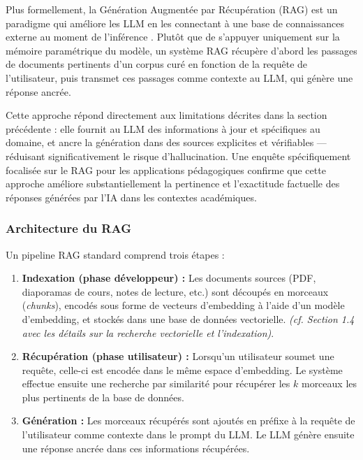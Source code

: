 \documentclass[a4paper,11pt]{article}
\begin{document}
Plus formellement, la Génération Augmentée par Récupération (RAG) est un
paradigme qui améliore les LLM en les connectant à une base de connaissances
externe au moment de l'inférence \cite{lewis2020rag}. Plutôt que de s'appuyer
uniquement sur la mémoire paramétrique du modèle, un système RAG récupère
d'abord les passages de documents pertinents d'un corpus curé en fonction de
la requête de l'utilisateur, puis transmet ces passages comme contexte au LLM,
qui génère une réponse ancrée.

Cette approche répond directement aux limitations décrites dans la section
précédente : elle fournit au LLM des informations à jour et spécifiques au
domaine, et ancre la génération dans des sources explicites et vérifiables
--- réduisant significativement le risque d'hallucination. Une enquête
spécifiquement focalisée sur le RAG pour les applications pédagogiques
\cite{rag_education_survey} confirme que cette approche améliore
substantiellement la pertinence et l'exactitude factuelle des réponses
générées par l'IA dans les contextes académiques.

\newpage
\subsubsection{Architecture du RAG}

Un pipeline RAG standard comprend trois étapes :

\begin{enumerate}
  \item \textbf{Indexation (phase développeur) :} Les documents sources (PDF,
    diaporamas de cours, notes de lecture, etc.) sont découpés en morceaux
    (\emph{chunks}), encodés sous forme de vecteurs d'embedding à l'aide d'un
    modèle d'embedding, et stockés dans une base de données vectorielle.
    \emph{(cf. Section 1.4 avec les détails sur la recherche vectorielle et
    l'indexation)}.

  \item \textbf{Récupération (phase utilisateur) :} Lorsqu'un utilisateur
    soumet une requête, celle-ci est encodée dans le même espace d'embedding.
    Le système effectue ensuite une recherche par similarité pour récupérer
    les $k$ morceaux les plus pertinents de la base de données.

  \item \textbf{Génération :} Les morceaux récupérés sont ajoutés en préfixe
    à la requête de l'utilisateur comme contexte dans le prompt du LLM. Le
    LLM génère ensuite une réponse ancrée dans ces informations récupérées.
\end{enumerate}
\end{document}
